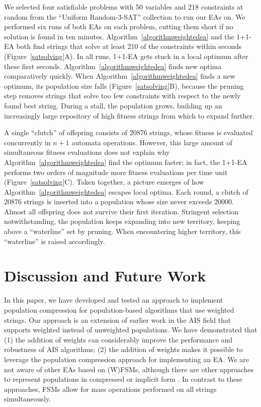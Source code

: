 \documentclass{llncs}
\begin{document}
We selected four satisfiable problems with 50 variables and 218 constraints
at random from the ``Uniform Random-3-SAT'' collection to run our EAs on.
We performed six runs of both EAs on each problem,
cutting them short if no solution is found in ten minutes.
%
Algorithm~\ref{algorithmweightedea} and the 1+1-EA both find strings
that solve at least 210 of the constraints within seconds
(Figure~\ref{satsolving}A).
In all runs,
1+1-EA gets stuck in a local optimum after these first seconds.
Algorithm~\ref{algorithmweightedea} finds new optima comparatively
quickly.
%
When Algorithm~\ref{algorithmweightedea} finds a new optimum,
its population size falls (Figure~\ref{satsolving}B),
because the pruning step removes strings that solve too few
constraints with respect to the newly found best string.
During a stall, the population grows,
building up an increasingly large repository of high fitness strings
from which to expand further.

A single ``clutch'' of offspring consists of 20876 strings,
whose fitness is evaluated concurrently in $n+1$ automata operations.
However, this large amount of simultaneous fitness evaluations does not 
explain why Algorithm~\ref{algorithmweightedea} find the optimum faster;
in fact, the 1+1-EA performs two orders of magnitude more fitness evaluations
per time unit (Figure~\ref{satsolving}C).
%
Taken together, a picture emerges of how
Algorithm~\ref{algorithmweightedea} escapes local optima.
Each round, a clutch of 20876 strings is inserted into a population
whose size never exceeds 20000.
Almost all offspring does not survive their first iteration.
Stringent selection notwithstanding,
the population keeps expanding into new territory,
keeping above a ``waterline'' set by pruning.
When encountering higher territory,
this ``waterline'' is raised accordingly.

\label{sectionwaga}
\section{Discussion and Future Work}

In this paper, we have developed and tested an approach to implement
population compression for population-based algorithms that use
weighted strings. Our approach is an extension of earlier work in the
AIS field \cite{Liskiewicz2010} that supports weighted instead of
unweighted populations. We have demonstrated that (1) the addition of
weights can considerably improve the performance and robustness of AIS
algorithms; (2) the addition of weights makes it possible to leverage
the population compression approach for implementing an EA. 
We are not aware of other EAs based on (W)FSMs, although 
there are other approaches to represent populations
in compressed or implicit form \cite{Baluja1995,Harik1999,Manso2009}.
In contrast to these approaches, FSMs allow for mass operations performed on
all strings simultaneously. 
\end{document}
